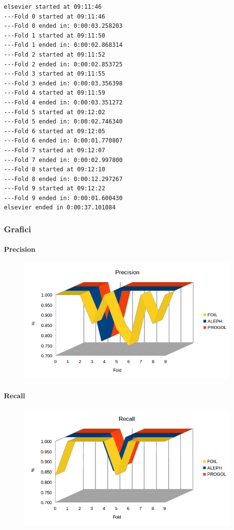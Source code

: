 \begin{verbatim}
elsevier started at 09:11:46
---Fold 0 started at 09:11:46
---Fold 0 ended in: 0:00:03.258203
---Fold 1 started at 09:11:50
---Fold 1 ended in: 0:00:02.868314
---Fold 2 started at 09:11:52
---Fold 2 ended in: 0:00:02.853725
---Fold 3 started at 09:11:55
---Fold 3 ended in: 0:00:03.356398
---Fold 4 started at 09:11:59
---Fold 4 ended in: 0:00:03.351272
---Fold 5 started at 09:12:02
---Fold 5 ended in: 0:00:02.746340
---Fold 6 started at 09:12:05
---Fold 6 ended in: 0:00:01.770807
---Fold 7 started at 09:12:07
---Fold 7 ended in: 0:00:02.997800
---Fold 8 started at 09:12:10
---Fold 8 ended in: 0:00:12.297267
---Fold 9 started at 09:12:22
---Fold 9 ended in: 0:00:01.600430
elsevier ended in 0:00:37.101084
\end{verbatim}
\subsubsection{Grafici}
\paragraph{Precision}
\begin{figure}[hbtp]
	\includegraphics[width=1.2\textwidth]{img/datasetGraph/elsevier/precision.png}
	\label{Elsevier-Precision}
\end{figure}
\paragraph{Recall}
\begin{figure}[hbtp]
	\includegraphics[width=1.2\textwidth]{img/datasetGraph/elsevier/recall.png}
	\label{Elsevier-Recall}
\end{figure}
